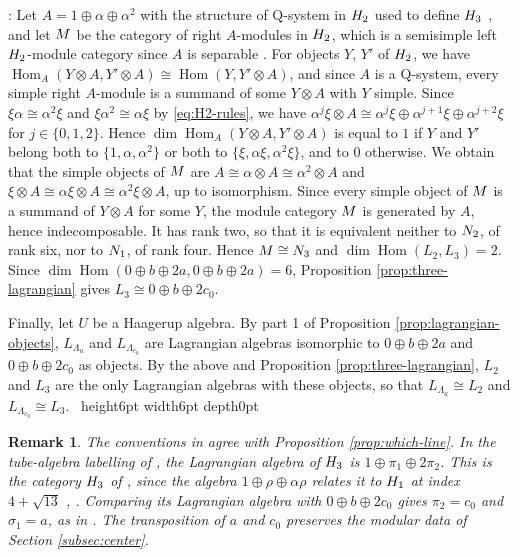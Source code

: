 \documentclass[leqno]{article}
\newcommand{\Q}{\mathrm{Q}}
\let\cal\relax
\newcommand{\cal}{\mathcal}
\newcommand{\qed}{\hfill \vrule height6pt  width6pt depth0pt}
\newcommand{\ot}{\otimes}
\newtheorem{remark}[thm]{Remark}
\newenvironment{proof}[1][]{\noindent {\it Proof #1} : }{\hbox{~}\qed
\smallskip
}
\numberwithin{equation}{section}
\begin{document}
\begin{proof}
Let $A = 1 \oplus \alpha \oplus \alpha^2$ with the structure of $\Q$-system in $\cal H_2$ used to define $\cal H_3$ \cite[Lemma 3.14 p.~21 and Definition 3.19 p.~23]{GrS12}, and let $\cal M$ be the category of right $A$-modules in $\cal H_2$, which is a semisimple left $\cal H_2$-module category since $A$ is separable \cite[Proposition 2.7 p.~5]{DMNO13}. For objects $Y$, $Y'$ of $\cal H_2$, we have $\operatorname{Hom}_A(Y \ot A,Y' \ot A) \cong \operatorname{Hom}(Y,Y' \ot A)$, and since $A$ is a $\Q$-system, every simple right $A$-module is a summand of some $Y \ot A$ with $Y$ simple. Since $\xi\alpha \cong \alpha^2\xi$ and $\xi\alpha^2 \cong \alpha\xi$ by \eqref{eq:H2-rules}, we have $\alpha^j\xi \ot A \cong \alpha^j\xi \oplus \alpha^{j+1}\xi \oplus \alpha^{j+2}\xi$ for $j \in \{0,1,2\}$. Hence $\dim\operatorname{Hom}_A(Y \ot A,Y' \ot A)$ is equal to $1$ if $Y$ and $Y'$ belong both to $\{1,\alpha,\alpha^2\}$ or both to $\{\xi,\alpha\xi,\alpha^2\xi\}$, and to $0$ otherwise. We obtain that the simple objects of $\cal M$ are $A \cong \alpha \ot A \cong \alpha^2 \ot A$ and $\xi \ot A \cong \alpha\xi \ot A \cong \alpha^2\xi \ot A$, up to isomorphism. Since every simple object of $\cal M$ is a summand of $Y \ot A$ for some $Y$, the module category $\cal M$ is generated by $A$, hence indecomposable. It has rank two, so that it is equivalent neither to $\cal N_2$, of rank six, nor to $\cal N_1$, of rank four. Hence $\cal M \cong \cal N_3$ and $\dim\operatorname{Hom}(L_2,L_3) = 2$. Since $\dim\operatorname{Hom}(0 \oplus b \oplus 2a,0 \oplus b \oplus 2a) = 6$, Proposition \ref{prop:three-lagrangian} gives $L_3 \cong 0 \oplus b \oplus 2c_0$.

Finally, let $U$ be a Haagerup algebra. By part 1 of Proposition \ref{prop:lagrangian-objects}, $L_{\Lambda_a}$ and $L_{\Lambda_{c_0}}$ are Lagrangian algebras isomorphic to $0 \oplus b \oplus 2a$ and $0 \oplus b \oplus 2c_0$ as objects. By the above and Proposition \ref{prop:three-lagrangian}, $L_2$ and $L_3$ are the only Lagrangian algebras with these objects, so that $L_{\Lambda_a} \cong L_2$ and $L_{\Lambda_{c_0}} \cong L_3$.
\end{proof}

\begin{remark}\normalfont
\label{rem:which-line}
The conventions in \cite[Remark 2.1]{Arh26} agree with Proposition \ref{prop:which-line}. In the tube-algebra labelling of \cite[(A8) p.~7]{AHKZ26}, the Lagrangian algebra of $\cal H_3$ is $1 \oplus \pi_1 \oplus 2\pi_2$. This is the category $\cal H_3$ of \cite{GrS12}, since the algebra $1 \oplus \rho \oplus \alpha\rho$ relates it to $\cal H_1$ at index $4+\sqrt{13}$ \cite[p.~4]{AHKZ26}, \cite[Theorems 1.3 and 1.4 pp.~3--4]{GrS12}. Comparing its Lagrangian algebra with $0 \oplus b \oplus 2c_0$ gives $\pi_2 = c_0$ and $\sigma_1 = a$, as in \cite[Remark 2.1]{Arh26}. The transposition of $a$ and $c_0$ preserves the modular data of Section \ref{subsec:center}.
\end{remark}
\end{document}
